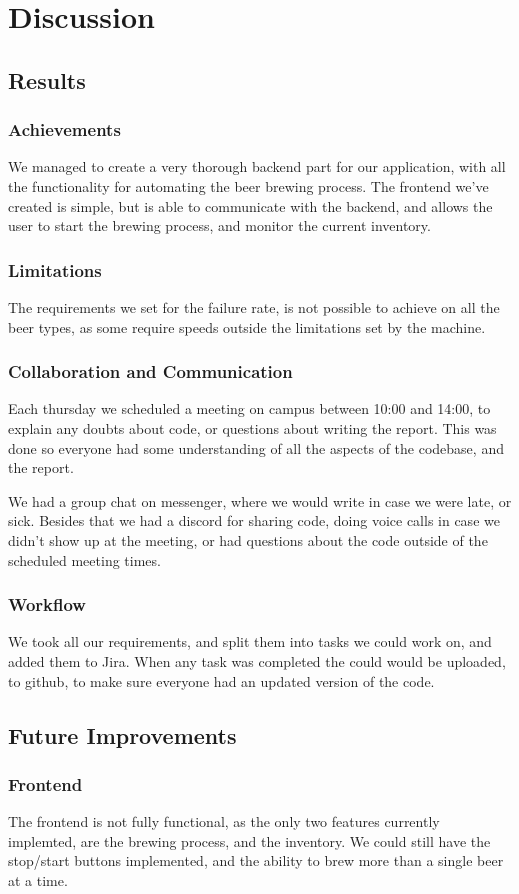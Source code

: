 \section{Discussion}

\subsection{Results}
\subsubsection{Achievements}
We managed to create a very thorough backend part for our application,
with all the functionality for automating the beer brewing process.
The frontend we've created is simple, but is able to communicate with the backend,
and allows the user to start the brewing process, and monitor the current inventory.

\subsubsection{Limitations}
The requirements we set for the failure rate,
is not possible to achieve on all the beer types,
as some require speeds outside the limitations set by the machine.

\subsubsection{Collaboration and Communication}
Each thursday we scheduled a meeting on campus between 10:00 and 14:00,
to explain any doubts about code, or questions about writing the report.
This was done so everyone had some understanding of all the aspects 
of the codebase, and the report.


We had a group chat on messenger, where we would write in case we were late,
or sick.
Besides that we had a discord for sharing code, doing voice calls in case 
we didn't show up at the meeting, or had questions about the code 
outside of the scheduled meeting times.

\subsubsection{Workflow}
We took all our requirements, and split them into tasks we could work on, 
and added them to Jira. When any task was completed the could would be uploaded,
to github, to make sure everyone had an updated version of the code.

\subsection{Future Improvements}
\subsubsection{Frontend}
The frontend is not fully functional, as the only two features currently implemted, are the brewing process, and the inventory.
We could still have the stop/start buttons implemented, and the ability to brew more than a single beer at a time.
